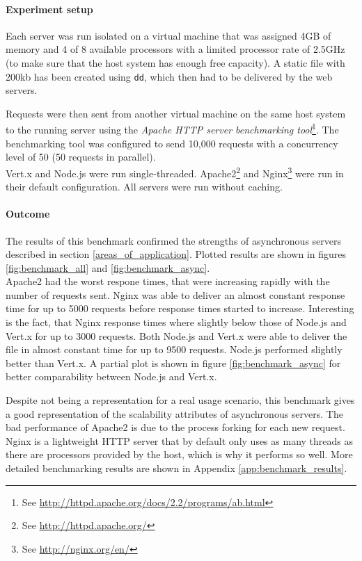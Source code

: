 \paragraph{Experiment setup} Each server was run isolated on a virtual machine
that was assigned 4GB of memory and 4 of 8 available processors with a limited processor rate
of 2.5GHz (to make sure that the host system has enough free capacity). A static
file with 200kb has been created using \texttt{dd}, which then had to be
delivered by the web servers.

Requests were then sent from another virtual machine on the same host system 
to the running server using the \textit{Apache HTTP server benchmarking 
tool}\footnote{See \url{http://httpd.apache.org/docs/2.2/programs/ab.html}}.
The benchmarking tool was configured to send 10,000 requests with a concurrency
level of 50 (50 requests in parallel).\\
Vert.x and Node.js were run single-threaded. Apache2\footnote{See \url{http://httpd.apache.org/}} and Nginx\footnote{See \url{http://nginx.org/en/}} were run in their
default configuration. All servers were run without caching.
\paragraph{Outcome} The results of this benchmark confirmed the strengths of asynchronous servers described in section \ref{areas_of_application}.
Plotted results are shown in figures \ref{fig:benchmark_all} and \ref{fig:benchmark_async}.\\
Apache2 had the worst respone times, that were increasing rapidly with the number of requests sent.
Nginx was able to deliver an almost constant response time for up to 5000 requests before response times started to increase.
Interesting is the fact, that Nginx response times where slightly below those of Node.js and Vert.x for up to 3000 requests.
Both Node.js and Vert.x were able to deliver the file in almost constant time for up to 9500 requests. Node.js performed slightly better than
Vert.x. A partial plot is shown in figure \ref{fig:benchmark_async} for better comparability between Node.js and Vert.x.

Despite not being a representation for a real usage scenario, this benchmark
gives a good representation of the scalability attributes of asynchronous 
servers. The bad performance of Apache2 is due to the process forking for each
new request. Nginx is a lightweight HTTP server that by default only uses as
many threads as there are processors provided by the host, which is why it
performs so well. More detailed benchmarking results are shown in Appendix \ref{app:benchmark_results}.


